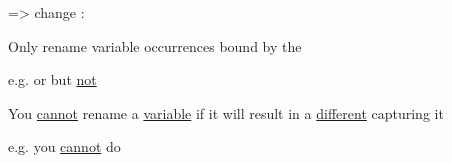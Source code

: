 \hSep

\begin{minipage}{\linewidth}
     => change :
    \begin{itemize}
        \vItem Only rename variable occurrences bound by the 

        \begin{itemize}
            \vItem
            e.g. 
            or
            but \ul{not}
        \end{itemize}
        \vItem
        You \ul{cannot} rename a \ul{variable} if it will result in a \ul{different} \iMbox{\lambda} capturing it

        \begin{itemize}
            \vItem
            e.g. you \ul{cannot} do
        \end{itemize}
    \end{itemize}
\end{minipage}

